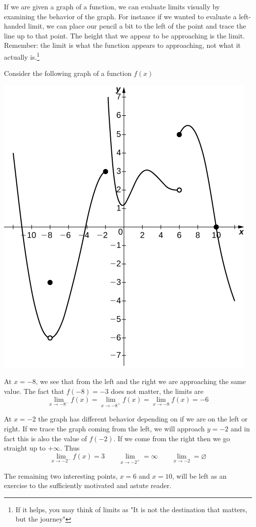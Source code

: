 If we are given a graph of a function, we can evaluate limits visually by examining the behavior of the graph. For instance if we wanted to evaluate a left-handed limit, we can place our pencil a bit to the left of the point and trace the line up to that point. The height that we appear to be approaching is the limit. Remember: the limit is what the function appears to approaching, not what it actually is.\footnote{If it helps, you may think of limits as "It is not the destination that matters, but the journey"}

\begin{example} 
Consider the following graph of a function $f(x)$
\begin{center}
	\includegraphics[scale=1]{images/Figure 2.2.1.jpg}
\end{center}

At $x = -8$, we see that from the left and the right we are approaching the same value. The fact that $f(-8) = -3$ does not matter, the limits are
\[ \lim_{x \to -8^-} f(x) = \lim_{x \to -8^+} f(x) = \lim_{x \to -8} f(x) = -6 \]

At $x = -2$ the graph has different behavior depending on if we are on the left or right. If we trace the graph coming from the left, we will approach $y = -2$ and in fact this is also the value of $f(-2)$. If we come from the right then we go straight up to $+ \infty$. Thus
\[ \lim_{x \to -2^-} f(x) = 3 \qquad \lim_{x \to -2^+} = \infty \qquad \lim_{x \to -2} = \varnothing \]

The remaining two interesting points, $x = 6$ and $x = 10$, will be left as an exercise to the sufficiently motivated and astute reader.
\end{example}

